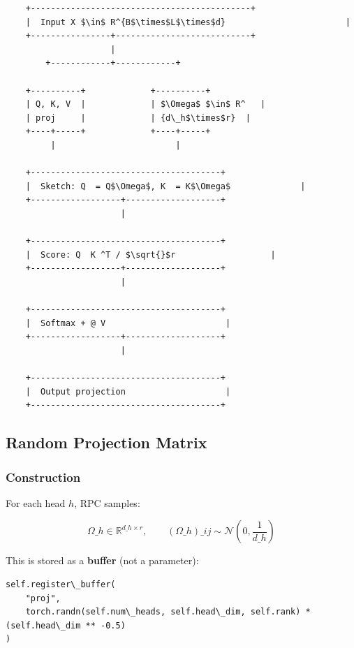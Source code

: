 \begin{lstlisting}
    +--------------------------------------------+
    |  Input X $\in$ R^{B$\times$L$\times$d}                        |
    +----------------+---------------------------+
                     |
        +------------+------------+
                                   
    +----------+             +----------+
    | Q, K, V  |             | $\Omega$ $\in$ R^   |
    | proj     |             | {d\_h$\times$r}  |
    +----+-----+             +----+-----+
         |                        |
                                   
    +--------------------------------------+
    |  Sketch: Q  = Q$\Omega$, K  = K$\Omega$              |
    +------------------+-------------------+
                       |
                        
    +--------------------------------------+
    |  Score: Q  K ^T / $\sqrt{}$r                   |
    +------------------+-------------------+
                       |
                        
    +--------------------------------------+
    |  Softmax + @ V                        |
    +------------------+-------------------+
                       |
                        
    +--------------------------------------+
    |  Output projection                    |
    +--------------------------------------+
\end{lstlisting}

\subsection{Random Projection Matrix}

\subsubsection{Construction}

For each head $h$, RPC samples:

\[
\Omega\_h \in \mathbb{R}^{d\_h \times r}, \qquad
(\Omega\_h)\_{ij} \sim \mathcal{N}\!\left(0, \frac{1}{d\_h}\right)
\tag{4.1}
\]

This is stored as a \textbf{buffer} (not a parameter):

\begin{lstlisting}
self.register\_buffer(
    "proj",
    torch.randn(self.num\_heads, self.head\_dim, self.rank) * (self.head\_dim ** -0.5)
)
\end{lstlisting}

